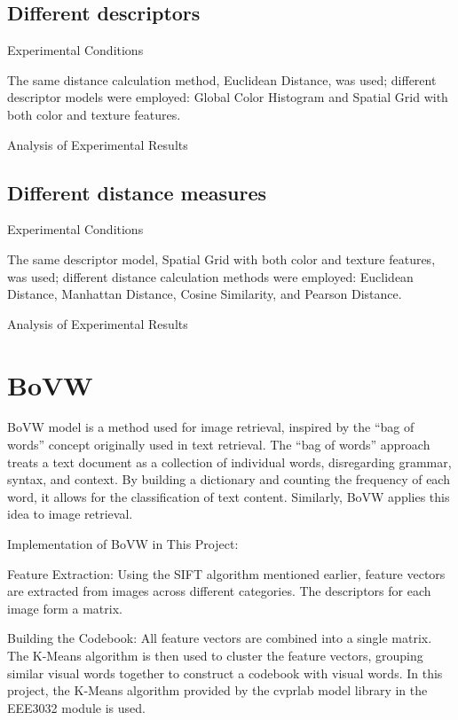 \documentclass{article}
\begin{document}
\subsection{Different descriptors}

Experimental Conditions

The same distance calculation method, Euclidean Distance, was used; different descriptor models were employed: Global Color Histogram and Spatial Grid with both color and texture features.

Analysis of Experimental Results


\subsection{Different distance measures}

Experimental Conditions

The same descriptor model, Spatial Grid with both color and texture features, was used; different distance calculation methods were employed: Euclidean Distance, Manhattan Distance, Cosine Similarity, and Pearson Distance.

Analysis of Experimental Results

\section{BoVW}

BoVW model is a method used for image retrieval, inspired by the “bag of words” concept originally used in text retrieval. The “bag of words” approach treats a text document as a collection of individual words, disregarding grammar, syntax, and context. By building a dictionary and counting the frequency of each word, it allows for the classification of text content. Similarly, BoVW applies this idea to image retrieval.



Implementation of BoVW in This Project:

Feature Extraction: Using the SIFT algorithm mentioned earlier, feature vectors are extracted from images across different categories. The descriptors for each image form a matrix.

​Building the Codebook: All feature vectors are combined into a single matrix. The K-Means algorithm is then used to cluster the feature vectors, grouping similar visual words together to construct a codebook with visual words. In this project, the K-Means algorithm provided by the cvprlab model library in the EEE3032 module is used.
\end{document}
